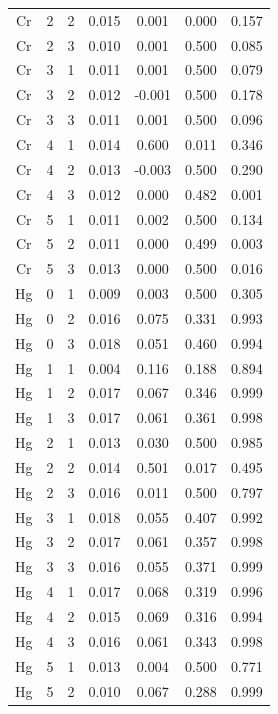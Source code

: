 \documentclass[ms, hidelinks]{uncgdissertationexp}
\theoremstyle{plain}
\theoremstyle{definition}
\theoremstyle{remark}
\begin{document}
\begin{longtable}{ccccccc}
Cr & 2 & 2 & 0.015 & 0.001 & 0.000 & 0.157\\
\rowcolor{gray!6}  Cr & 2 & 3 & 0.010 & 0.001 & 0.500 & 0.085\\
Cr & 3 & 1 & 0.011 & 0.001 & 0.500 & 0.079\\
\rowcolor{gray!6}  Cr & 3 & 2 & 0.012 & -0.001 & 0.500 & 0.178\\
Cr & 3 & 3 & 0.011 & 0.001 & 0.500 & 0.096\\
\rowcolor{gray!6}  Cr & 4 & 1 & 0.014 & 0.600 & 0.011 & 0.346\\
Cr & 4 & 2 & 0.013 & -0.003 & 0.500 & 0.290\\
\rowcolor{gray!6}  Cr & 4 & 3 & 0.012 & 0.000 & 0.482 & 0.001\\
Cr & 5 & 1 & 0.011 & 0.002 & 0.500 & 0.134\\
\rowcolor{gray!6}  Cr & 5 & 2 & 0.011 & 0.000 & 0.499 & 0.003\\
Cr & 5 & 3 & 0.013 & 0.000 & 0.500 & 0.016\\
\rowcolor{gray!6}  Hg & 0 & 1 & 0.009 & 0.003 & 0.500 & 0.305\\
Hg & 0 & 2 & 0.016 & 0.075 & 0.331 & 0.993\\
\rowcolor{gray!6}  Hg & 0 & 3 & 0.018 & 0.051 & 0.460 & 0.994\\
Hg & 1 & 1 & 0.004 & 0.116 & 0.188 & 0.894\\
\rowcolor{gray!6}  Hg & 1 & 2 & 0.017 & 0.067 & 0.346 & 0.999\\
Hg & 1 & 3 & 0.017 & 0.061 & 0.361 & 0.998\\
\rowcolor{gray!6}  Hg & 2 & 1 & 0.013 & 0.030 & 0.500 & 0.985\\
Hg & 2 & 2 & 0.014 & 0.501 & 0.017 & 0.495\\
\rowcolor{gray!6}  Hg & 2 & 3 & 0.016 & 0.011 & 0.500 & 0.797\\
Hg & 3 & 1 & 0.018 & 0.055 & 0.407 & 0.992\\
\rowcolor{gray!6}  Hg & 3 & 2 & 0.017 & 0.061 & 0.357 & 0.998\\
Hg & 3 & 3 & 0.016 & 0.055 & 0.371 & 0.999\\
\rowcolor{gray!6}  Hg & 4 & 1 & 0.017 & 0.068 & 0.319 & 0.996\\
Hg & 4 & 2 & 0.015 & 0.069 & 0.316 & 0.994\\
\rowcolor{gray!6}  Hg & 4 & 3 & 0.016 & 0.061 & 0.343 & 0.998\\
Hg & 5 & 1 & 0.013 & 0.004 & 0.500 & 0.771\\
\rowcolor{gray!6}  Hg & 5 & 2 & 0.010 & 0.067 & 0.288 & 0.999\\

\end{longtable}
\end{document}
